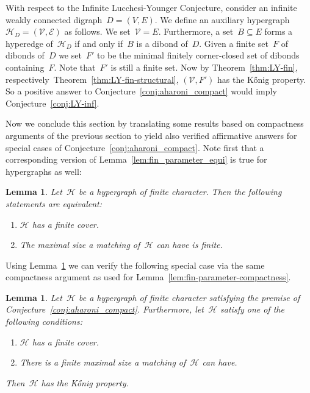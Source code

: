 \documentclass[reqno, 12pt]{amsart}
\numberwithin{equation}{section}
\numberwithin{figure}{section}
\theoremstyle{plain}
\newtheorem{lemma}[thm]{Lemma}
\theoremstyle{definition}
\begin{document}
With respect to the Infinite Lucchesi-Younger Conjecture, consider an infinite weakly connected digraph~${D = (V, E)}$.
We define an auxiliary hypergraph~${\mathcal{H}_{D} = (\mathcal{V}, \mathcal{E})}$ as follows.
We set~${\mathcal{V} = E}$.
Furthermore, a set~${B \subseteq E}$ forms a hyperedge of~$\mathcal{H}_{D}$ if and only if~$B$ is a dibond of~$D$.
Given a finite set~$F$ of dibonds of~$D$ we set~$F'$ to be the minimal finitely corner-closed set of dibonds containing~$F$. 
Note that~$F'$ is still a finite set. 
Now by Theorem~\ref{thm:LY-fin},
respectively~Theorem~\ref{thm:LY-fin-structural},
${(\mathcal{V}, F')}$ has the K\H{o}nig property.
So a positive answer to Conjecture~\ref{conj:aharoni_compact} would imply Conjecture~\ref{conj:LY-inf}. 

Now we conclude this section by translating some results based on compactness arguments of the previous section to yield also verified affirmative answers for special cases of Conjecture~\ref{conj:aharoni_compact}. 
Note first that a corresponding version of Lemma~\ref{lem:fin_parameter_equi} is true for hypergraphs as well:

\begin{lemma}\label{lem:fin_parameter_hyper}
    Let~$\mathcal{H}$ be a hypergraph of finite character.
    Then the following statements are equivalent:
    \begin{enumerate}[label=\textit{(\roman*)}]
        \item \label{item:hyper-1} $\mathcal{H}$ has a finite cover. 
        \item \label{item:hyper-2} The maximal size a matching of~$\mathcal{H}$ can have is finite. 
    \end{enumerate}
\end{lemma}

Using Lemma~\ref{lem:fin_parameter_hyper} we can verify the following special case via the same compactness argument as used for Lemma~\ref{lem:fin-parameter-compactness}. 

\begin{lemma}\label{lem:aharoni_fin_parameter}
    Let~$\mathcal{H}$ be a hypergraph of finite character satisfying the premise of Conjecture~\ref{conj:aharoni_compact}. 
    Furthermore, let~$\mathcal{H}$ satisfy one of the following conditions: 
    \begin{enumerate}[label=\textit{(\roman*)}]
        \item $\mathcal{H}$ has a finite cover. 
        \item There is a finite maximal size a matching of~$\mathcal{H}$ can have.
    \end{enumerate}
    Then~$\mathcal{H}$ has the K\H{o}nig property. 
\end{lemma}
\end{document}
